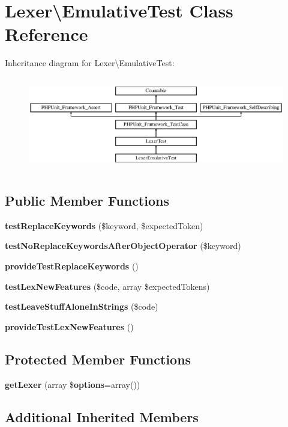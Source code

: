\section{Lexer\textbackslash{}Emulative\+Test Class Reference}
\label{class_php_parser_1_1_lexer_1_1_emulative_test}
Inheritance diagram for Lexer\textbackslash{}Emulative\+Test\+:\begin{figure}[H]
\begin{center}
\leavevmode
\includegraphics[height=4.129793cm]{class_php_parser_1_1_lexer_1_1_emulative_test}
\end{center}
\end{figure}
\subsection*{Public Member Functions}
\begin{DoxyCompactItemize}
\item 
{\bf test\+Replace\+Keywords} (\$keyword, \$expected\+Token)
\item 
{\bf test\+No\+Replace\+Keywords\+After\+Object\+Operator} (\$keyword)
\item 
{\bf provide\+Test\+Replace\+Keywords} ()
\item 
{\bf test\+Lex\+New\+Features} (\$code, array \$expected\+Tokens)
\item 
{\bf test\+Leave\+Stuff\+Alone\+In\+Strings} (\$code)
\item 
{\bf provide\+Test\+Lex\+New\+Features} ()
\end{DoxyCompactItemize}
\subsection*{Protected Member Functions}
\begin{DoxyCompactItemize}
\item 
{\bf get\+Lexer} (array \${\bf options}=array())
\end{DoxyCompactItemize}
\subsection*{Additional Inherited Members}


